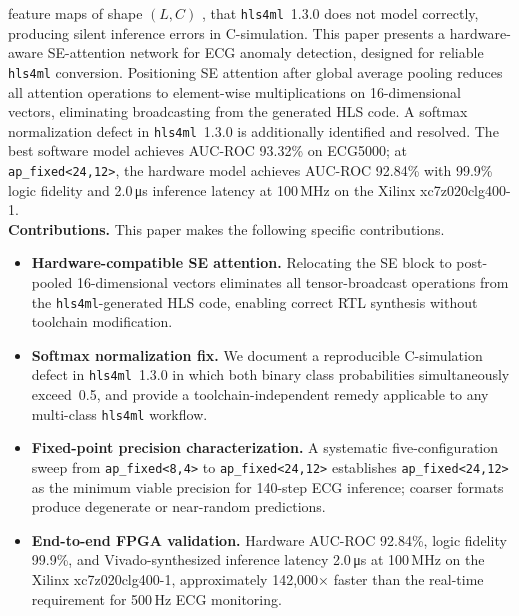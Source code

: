 \documentclass[12pt, letterpaper]{article}
\begin{document}
feature maps of shape $(L,C)$ , that \texttt{hls4ml}~1.3.0 does not
model correctly, producing silent inference errors in C-simulation.
This paper presents a hardware-aware SE-attention network for ECG anomaly
detection, designed for reliable \texttt{hls4ml} conversion.
Positioning
SE attention after global average pooling reduces all attention operations
to element-wise multiplications on 16-dimensional vectors, eliminating
broadcasting from the generated HLS code.
A softmax normalization defect
in \texttt{hls4ml}~1.3.0 is additionally identified and resolved. The
best software model achieves AUC-ROC 93.32\% on ECG5000;
at
\texttt{ap\_fixed<24,12>}, the hardware model achieves AUC-ROC 92.84\%
with 99.9\% logic fidelity and 2.0\,\si{\micro\second} inference latency
at 100\,MHz on the Xilinx xc7z020clg400-1. \\

\medskip
\noindent\textbf{Contributions.}\;
This paper makes the following
specific contributions.

\begin{itemize}[leftmargin=2em, noitemsep, topsep=4pt]

  \item \textbf{Hardware-compatible SE attention.}
    Relocating the SE block to post-pooled 16-dimensional vectors
    eliminates all tensor-broadcast operations from the
    \texttt{hls4ml}-generated HLS code, enabling correct RTL synthesis
    without toolchain modification.
\item \textbf{Softmax normalization fix.}
    We document a reproducible C-simulation defect in
    \texttt{hls4ml}~1.3.0 in which both binary class probabilities
    simultaneously exceed~0.5, and provide a toolchain-independent remedy
    applicable to any multi-class \texttt{hls4ml} workflow.
\item \textbf{Fixed-point precision characterization.}
    A systematic five-configuration sweep from \texttt{ap\_fixed<8,4>}
    to \texttt{ap\_fixed<24,12>} establishes \texttt{ap\_fixed<24,12>}
    as the minimum viable precision for 140-step ECG inference;
coarser
    formats produce degenerate or near-random predictions.
\item \textbf{End-to-end FPGA validation.}
    Hardware AUC-ROC 92.84\%, logic fidelity 99.9\%, and
    Vivado-synthesized inference latency 2.0\,\si{\micro\second} at
    100\,MHz on the Xilinx xc7z020clg400-1, approximately
    142,000$\times$ faster than the real-time requirement for 500\,Hz
    ECG monitoring.
\end{itemize}
\end{document}
